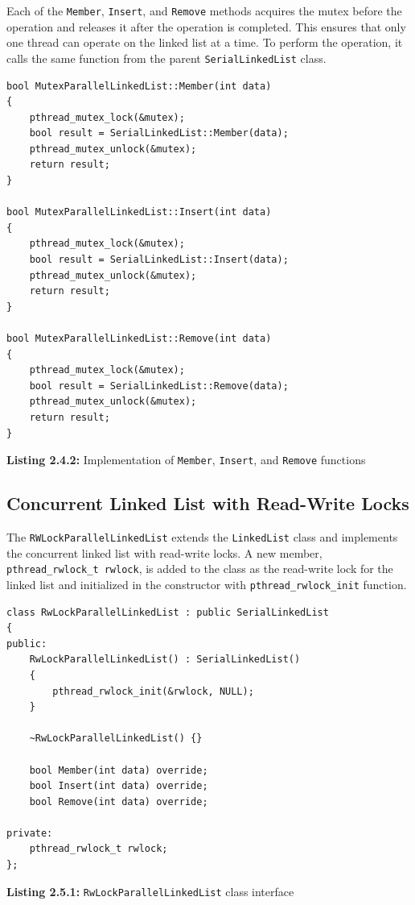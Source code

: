 \documentclass[a4paper,12pt]{article}
\begin{document}
Each of the \lstinline|Member|, \lstinline|Insert|, and \lstinline|Remove| methods acquires the mutex before the operation and releases it after the operation is completed. This ensures that only one thread can operate on the linked list at a time. To perform the operation, it calls the same function from the parent \lstinline|SerialLinkedList| class.

\begin{lstlisting}
bool MutexParallelLinkedList::Member(int data)
{
    pthread_mutex_lock(&mutex);
    bool result = SerialLinkedList::Member(data);
    pthread_mutex_unlock(&mutex);
    return result;
}

bool MutexParallelLinkedList::Insert(int data)
{
    pthread_mutex_lock(&mutex);
    bool result = SerialLinkedList::Insert(data);
    pthread_mutex_unlock(&mutex);
    return result;
}

bool MutexParallelLinkedList::Remove(int data)
{
    pthread_mutex_lock(&mutex);
    bool result = SerialLinkedList::Remove(data);
    pthread_mutex_unlock(&mutex);
    return result;
}
\end{lstlisting}
\begin{center}
    \textbf{Listing 2.4.2:} Implementation of \lstinline|Member|, \lstinline|Insert|, and \lstinline|Remove| functions
\end{center}

\subsection{Concurrent Linked List with Read-Write Locks}

The \lstinline|RWLockParallelLinkedList| extends the \lstinline|LinkedList| class and implements the concurrent linked list with read-write locks. A new member, \lstinline|pthread_rwlock_t rwlock|, is added to the class as the read-write lock for the linked list and initialized in the constructor with \lstinline|pthread_rwlock_init| function.

\begin{lstlisting}
class RwLockParallelLinkedList : public SerialLinkedList
{
public:
    RwLockParallelLinkedList() : SerialLinkedList()
    {
        pthread_rwlock_init(&rwlock, NULL);
    }

    ~RwLockParallelLinkedList() {}

    bool Member(int data) override;
    bool Insert(int data) override;
    bool Remove(int data) override;

private:
    pthread_rwlock_t rwlock;
};
\end{lstlisting}
\begin{center}
    \textbf{Listing 2.5.1:} \lstinline|RwLockParallelLinkedList| class interface
\end{center}
\end{document}
